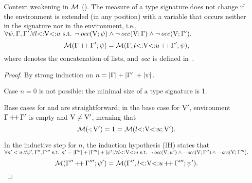 \begin{lemma}{Context weakening in $\operatorname{\mathcal{M}}$ (\textbf{}).}%
\label{lem:msr-weakening:app}
    The measure of a type signature does not change if the environment
    is extended (in any position) with a variable that occurs neither
    in the signature nor in the environment, i.e.,
    $\forall \psi, \Gamma, \Gamma'. 
    \forall l{\operatorname{<:}}\mathrm{V}{\operatorname{<:}}u \text{ s.t. } 
    \lnot \operatorname{\mathit{occ}}(\mathrm{V};\psi) \land 
    \lnot \operatorname{\mathit{occ}}(\mathrm{V};\Gamma) \land \lnot \operatorname{\mathit{occ}}(\mathrm{V};\Gamma').$
    \[\operatorname{\mathcal{M}}(\Gamma\operatorname{+\!+}\Gamma';\psi) = 
        \operatorname{\mathcal{M}}(\Gamma,l{\operatorname{<:}}\mathrm{V}{\operatorname{<:}}u\operatorname{+\!+}\Gamma';\psi),\]
    where  denotes the concatenation of lists,
    and $\operatorname{\mathit{occ}}$ is defined in~.
\end{lemma}
\begin{proof}
    By strong induction on $n = |\Gamma| + |\Gamma'| + |\psi|$.

    Case $n = 0$ is not possible: the minimal size of a type signature is 1.

    Base cases for \tyany and \tybot are straightforward; in the base case
    for $\mathrm{V}'$, environment $\Gamma\operatorname{+\!+}\Gamma'$ is empty and
    $\mathrm{V} \neq \mathrm{V}'$, 
    meaning that \[\operatorname{\mathcal{M}}(\cdot;\mathrm{V}') = 1 = 
    \operatorname{\mathcal{M}}(l{\operatorname{<:}}\mathrm{V}{\operatorname{<:}}u;\mathrm{V}').\]
    
    In the inductive step for $n$, the induction hypothesis (IH) states that
    $\forall n'<n. \forall \psi', \Gamma'', \Gamma'''  \text{ s.t. }
    n' = |\Gamma''| + |\Gamma'''| + |\psi'|.
    \forall l{\operatorname{<:}}\mathrm{V}{\operatorname{<:}}u \text{ s.t. } 
    \lnot \operatorname{\mathit{occ}}(\mathrm{V};\psi') \land 
    \lnot \operatorname{\mathit{occ}}(\mathrm{V};\Gamma'') \land \lnot \operatorname{\mathit{occ}}(\mathrm{V};\Gamma''').$
    \[\operatorname{\mathcal{M}}(\Gamma''\operatorname{+\!+}\Gamma''';\psi') = 
    \operatorname{\mathcal{M}}(\Gamma'',l{\operatorname{<:}}\mathrm{V}{\operatorname{<:}}u\operatorname{+\!+}\Gamma''';\psi').\]
    

\end{proof}
